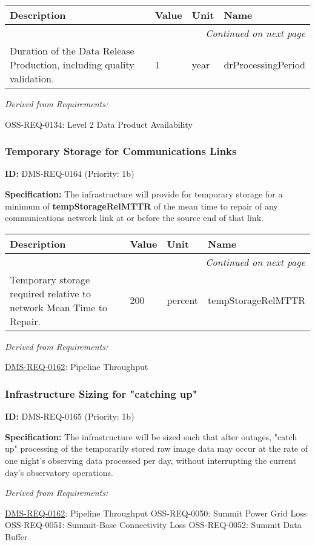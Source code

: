 \documentclass[SE,toc,lsstdraft]{lsstdoc}
\makeatletter
\newcommand{\paramname}[1]{\hspace{0pt}#1}
\newcommand{\unitname}[1]{\hspace{0pt}#1}
\newenvironment{parameters}[0]{%
\setlength\LTleft{0pt}
\setlength\LTright{\fill}
\begin{small}
\begin{longtable}[]{|p{0.49\textwidth}|l|p{0.6in}|p{1.70in}@{}|}

\hline \textbf{Description} & \textbf{Value} & \textbf{Unit} & \textbf{Name} \\ \hline
\endhead

\hline \multicolumn{4}{r}{\emph{Continued on next page}} \\
\endfoot

\hline\hline
\endlastfoot
}{%
\hline
\end{longtable}
\end{small}
}
\makeatother
\begin{document}
\begin{parameters}
Duration of the Data Release Production, including quality validation.
&
1
&
\unitname{%
year
}
&
\paramname{%
drProcessingPeriod
} \\\hline
\end{parameters}

\emph{Derived from Requirements:}

OSS-REQ-0134:
Level 2 Data Product Availability \newline

\subsubsection{Temporary Storage for Communications Links}

\label{DMS-REQ-0164}
\textbf{ID:} DMS-REQ-0164 (Priority: 1b)

    \textbf{Specification: }The infrastructure will provide for temporary storage for a minimum of \textbf{tempStorageRelMTTR} of the mean time to repair of any communications network link at or before the source end of that link.

\begin{parameters}
Temporary storage required relative to network Mean Time to Repair.
&
200
&
\unitname{%
percent
}
&
\paramname{%
tempStorageRelMTTR
} \\\hline
\end{parameters}

\emph{Derived from Requirements:}

\hyperref[DMS-REQ-0162]{DMS-REQ-0162}:
Pipeline Throughput \newline

\subsubsection{Infrastructure Sizing for "catching up"}

\label{DMS-REQ-0165}
\textbf{ID:} DMS-REQ-0165 (Priority: 1b)

    \textbf{Specification: }The infrastructure will be sized such that after outages, "catch up" processing of the temporarily stored raw image data may occur at the rate of one night’s observing data processed per day, without interrupting the current day's observatory operations.

\emph{Derived from Requirements:}

\hyperref[DMS-REQ-0162]{DMS-REQ-0162}:
Pipeline Throughput \newline
OSS-REQ-0050:
Summit Power Grid Loss \newline
OSS-REQ-0051:
Summit-Base Connectivity Loss \newline
OSS-REQ-0052:
Summit Data Buffer \newline
\end{document}
